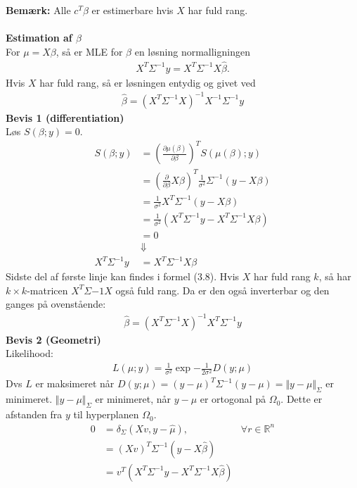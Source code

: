 \documentclass[12pt,a4paper]{report}
\begin{document}
\textbf{Bemærk:} Alle $c^T\beta$ er estimerbare hvis $X$ har fuld rang.\\\\
\textbf{Estimation af $\beta$}\\
For $\mu=X\beta$, så er MLE for $\beta$ en løsning normalligningen
\begin{align*}
X^T\Sigma^{-1}y=X^T\Sigma^{-1}X\hat{\beta}.
\end{align*}
Hvis $X$ har fuld rang, så er løsningen entydig og givet ved
\begin{align*}
\hat{\beta}=\left(X^T\Sigma^{-1}X\right)^{-1}X^{-1}\Sigma^{-1}y
\end{align*}
\textbf{Bevis 1 (differentiation)}\\
Løs $S(\beta;y)=0$.
\begin{align*}
S(\beta;y)&=\left(\frac{\partial\mu(\beta)}{\partial\beta}\right)^TS(\mu(\beta);y)\\
&=\left(\frac{\partial}{\partial\beta}X\beta\right)^T\frac{1}{\sigma^2}\Sigma^{-1}(y-X\beta)\\
&=\frac{1}{\sigma^2}X^T\Sigma^{-1}(y-X\beta)\\
&=\frac{1}{\sigma^2}(X^T\Sigma^{-1}y-X^T\Sigma^{-1}X\beta)\\
&=0\\
&\Downarrow\\
X^T\Sigma^{-1}y&=X^T\Sigma^{-1}X\beta
\end{align*}
Sidste del af første linje kan findes i formel (3.8).
Hvis $X$ har fuld rang $k$, så har $k\times k$-matricen $X^T\Sigma{-1}X$ også fuld rang. Da er den også inverterbar og den ganges på ovenstående:
\begin{align*}
\hat{\beta}=\left(X^T\Sigma^{-1}X\right)^{-1}X^T\Sigma^{-1}y
\end{align*}
\textbf{Bevis 2 (Geometri)}\\
Likelihood:
\begin{align*}
L(\mu;y)=\frac{1}{\sigma^2}\exp{-\frac{1}{2\sigma^2}D(y;\mu)}
\end{align*}
Dvs $L$ er maksimeret når $D(y;\mu)=(y-\mu)^T\Sigma^{-1}(y-\mu)=\Vert y-\mu\Vert_{\Sigma}$ er minimeret. $\Vert y-\mu\Vert_{\Sigma}$ er minimeret, når $y-\mu$ er ortogonal på $\Omega_0$. Dette er afstanden fra $y$ til hyperplanen $\Omega_0$.
\begin{align*}
0&=\delta_{\Sigma}\left(Xv,y-\hat{\mu}\right),&\forall r\in\mathbb{R}^n\\
&=\left(Xv\right)^T\Sigma^{-1}\left(y-X\hat{\beta}\right)\\
&=v^T\left(X^T\Sigma^{-1}y-X^T\Sigma^{-1}X\hat{\beta}\right)
\end{align*}
\end{document}
